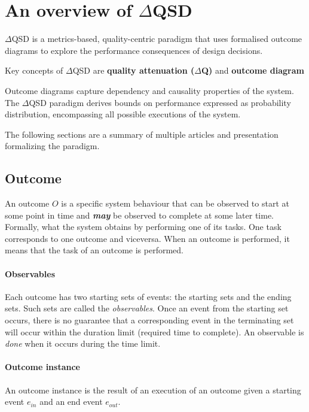 \section{An overview of $\Delta$QSD}
    $\Delta$QSD is a metrics-based, quality-centric paradigm that uses formalised outcome diagrams to explore the performance consequences of design decisions. \cite{myo}
    
    Key concepts of $\Delta$QSD are \textbf{quality attenuation ($\Delta$Q)} and \textbf{outcome diagram}

    Outcome diagrams capture dependency and causality properties of the system. The $\Delta$QSD paradigm derives bounds on performance expressed as probability distribution, encompassing all possible executions of the system. 
 
    The following sections are a summary of multiple articles and presentation formalizing the paradigm. \cite{dq-tut} \cite{myo} \cite{art} \cite{dq-br} 
     
 \subsection{Outcome}
           An outcome $O$ is a specific system behaviour that can be observed to start at some point in time and \textit{\textbf{may}} be observed to complete at some later time. \cite{dq-br}
        Formally, what the system obtains by performing one of its tasks. One task corresponds to one outcome and viceversa. When an outcome is performed, it means that the task of an outcome is performed.
     
     \paragraph{Observables}
    Each outcome has two starting sets of events: the starting sets and the ending sets. Such sets are called the \textit{observables}. Once an event from the starting set occurs, there is no guarantee that a corresponding event in the terminating set will occur within the duration limit (required time to complete). An observable is \textit{done}  when it occurs during the time limit. \cite{art}

    \paragraph{Outcome instance}
    An outcome instance is the result of an execution of an outcome given a starting event $e_{in}$ and an end event $e_{out}$. 

